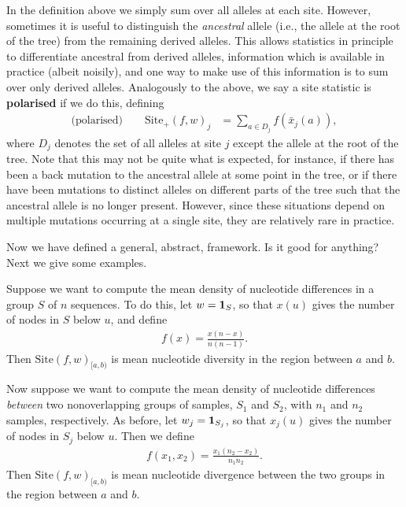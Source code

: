 \documentclass{article}
\newcommand{\site}{\mbox{Site}} %
\newcommand{\sitep}{\mbox{Site}_+} %
\newcommand{\iw}{w} %
\newcommand{\nw}{x} %
\newcommand{\aw}{{\bar x}} %
\begin{document}
In the definition above we simply sum over all alleles at each site.
However, sometimes it is useful to distinguish the \emph{ancestral} allele
(i.e., the allele at the root of the tree) from the remaining derived alleles.
This allows statistics in principle to differentiate ancestral from derived alleles,
information which is available in practice (albeit noisily),
and one way to make use of this information is to sum over only derived alleles.
Analogously to the above,
we say a site statistic is \textbf{polarised} if we do this,
defining
\begin{align} \label{eqn:site_polarised}
    \text{(polarised)} \qquad
    \sitep(f, \iw)_j
    &=
    \sum_{a \in D_j} f(\aw_j(a)) ,
\end{align}
where $D_j$ denotes the set of all alleles at site $j$ except the allele at the root of the tree.
Note that this may not be quite what is expected,
for instance, if there has been a back mutation to the ancestral allele at some point in the tree,
or if there have been mutations to distinct alleles on different parts of the tree
such that the ancestral allele is no longer present.
However, since these situations depend on multiple mutations occurring at a single site,
they are relatively rare in practice.

Now we have defined a general, abstract, framework.
Is it good for anything?
Next we give some examples.

\begin{example} \label{ex:site_diversity}
    Suppose we want to compute the mean density of nucleotide differences
    in a group $S$ of $n$ sequences.
    To do this,
    let $\iw = \bone_S$,
    so that $\nw(u)$ gives the number of nodes in $S$ below $u$,
    and define
    \begin{align*}
        f(x) = \frac{x (n - x)}{n (n-1)} .
    \end{align*}
    Then $\site(f, \iw)_{[a,b)}$ is mean nucleotide diversity in the region between $a$ and $b$.
\end{example}

\begin{example} \label{ex:site_divergence}
    Now suppose we want to compute the mean density of nucleotide differences
    \emph{between} two nonoverlapping groups of samples, $S_1$ and $S_2$,
    with $n_1$ and $n_2$ samples, respectively.
    As before,
    let $\iw_j = \bone_{S_j}$,
    so that $\nw_{j}(u)$ gives the number of nodes in $S_j$ below $u$.
    Then we define
    \begin{align*}
        f(x_1, x_2) = \frac{x_1 (n_2 - x_2)}{n_1 n_2} .
    \end{align*}
    Then $\site(f, \iw)_{[a,b)}$ is mean nucleotide divergence between the two groups
    in the region between $a$ and $b$.
\end{example}
\end{document}
